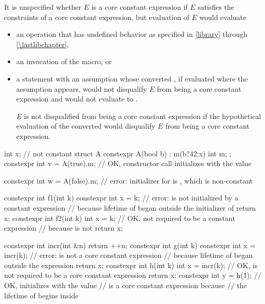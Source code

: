 It is unspecified whether $E$ is a core constant expression
if $E$ satisfies the constraints of a core constant expression, but
evaluation of $E$ would evaluate
\begin{itemize}
\item
an operation that has undefined behavior
as specified in \ref{library} through \ref{\lastlibchapter},
\item
an invocation of the  macro, or
\item
a statement with an assumption
whose converted ,
if evaluated where the assumption appears,
would not disqualify $E$ from being a core constant expression and
would not evaluate to .
\begin{note}
$E$ is not disqualified from being a core constant expression
if the hypothetical evaluation of
the converted 
would disqualify $E$ from being a core constant expression.
\end{note}
\end{itemize}
\begin{example}
\begin{codeblock}
int x;                              // not constant
struct A {
  constexpr A(bool b) : m(b?42:x) { }
  int m;
};
constexpr int v = A(true).m;        // OK, constructor call initializes  with the value 

constexpr int w = A(false).m;       // error: initializer for  is , which is non-constant

constexpr int f1(int k) {
  constexpr int x = k;              // error:  is not initialized by a constant expression
                                    // because lifetime of  began outside the initializer of 
  return x;
}
constexpr int f2(int k) {
  int x = k;                        // OK, not required to be a constant expression
                                    // because  is not 
  return x;
}

constexpr int incr(int &n) {
  return ++n;
}
constexpr int g(int k) {
  constexpr int x = incr(k);        // error:  is not a core constant expression
                                    // because lifetime of  began outside the expression 
  return x;
}
constexpr int h(int k) {
  int x = incr(k);                  // OK,  is not required to be a core constant expression
  return x;
}
constexpr int y = h(1);             // OK, initializes  with the value 
                                    //  is a core constant expression because
                                    // the lifetime of  begins inside 
\end{codeblock}
\end{example}

